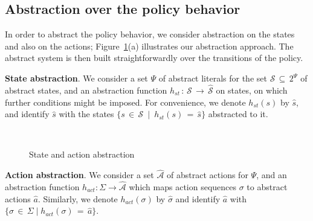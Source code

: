\documentclass{new_tlp}
\newcommand{\leanparagraph}[1]{\smallskip\noindent\textbf{#1}. }
\begin{document}
\subsection{Abstraction over the policy behavior}


In order to abstract the policy behavior, we consider abstraction on the states and also on the actions; Figure~\ref{fig:abs_fig}(a) illustrates our abstraction approach. The abstract system is then built straightforwardly over the transitions 
of the policy.

\leanparagraph{State abstraction}We consider a set
$\Psi$ of abstract literals
for the set
$\hat{\mathcal{S}} \,{\subseteq}\, 2^{\Psi}$ of abstract states, and
an abstraction function
%
$h_{st}\,{:}\,\mathcal{S} \,{\rightarrow}\, \hat{\mathcal{S}}$
on states, on which further conditions might be imposed.
For convenience, we denote %
$h_{st}(s)$ %
by $\hat{s}$, and identify %
$\hat{s}$
 with the states $\{ s\,{\in}\, \mathcal{S}\ {\mid}\
 h_{st}(s)\,{=}\, \hat{s}\}$
abstracted to it.

\begin{figure}[t]
\caption{State and action abstraction}
\vspace{0.5em}
\label{fig:abs_fig}
\centering
{}~~~
\vspace{-1.5em}
\end{figure}


\leanparagraph{Action abstraction} 
We consider a set $\hat{\mathcal{A}}$ of abstract actions
for $\Psi$, and an abstraction function
$h_{act}{:} \Sigma {\rightarrow} \hat{\mathcal{A}}$ which maps 
action sequences $\sigma$ to abstract actions $\hat{a}$. %
Similarly, 
we denote $h_{act}(\sigma)$ by $\hat{\sigma}$ and identify
$\hat{a}$ with $\{ \sigma \,{\in}\, \Sigma \mid h_{act}(\sigma)\,{=}\,\hat{a}\}$.
\end{document}
